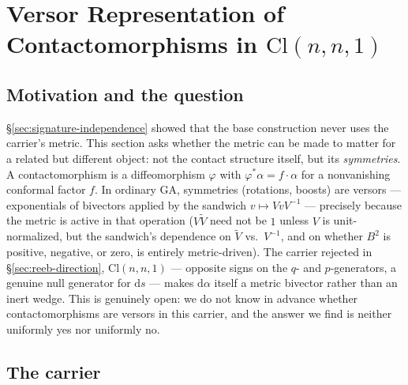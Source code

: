 \documentclass[11pt]{article}
\newcommand{\Cl}{\mathrm{Cl}}
\newcommand{\dif}{\mathrm{d}}
\begin{document}
\section{Versor Representation of Contactomorphisms in \texorpdfstring{$\Cl(n,n,1)$}{Cl(n,n,1)}}
\label{sec:versors}

\subsection{Motivation and the question}

\S\ref{sec:signature-independence} showed that the base construction never uses the carrier's metric. This section asks whether the metric can be made to matter for a related but different object: not the contact structure itself, but its \emph{symmetries}. A contactomorphism is a diffeomorphism $\varphi$ with $\varphi^*\alpha = f\cdot\alpha$ for a nonvanishing conformal factor $f$. In ordinary GA, symmetries (rotations, boosts) are versors — exponentials of bivectors applied by the sandwich $v\mapsto VvV^{-1}$ — precisely because the metric is active in that operation ($V\tilde V$ need not be $1$ unless $V$ is unit-normalized, but the sandwich's dependence on $\tilde V$ vs.\ $V^{-1}$, and on whether $B^2$ is positive, negative, or zero, is entirely metric-driven). The carrier rejected in \S\ref{sec:reeb-direction}, $\Cl(n,n,1)$ — opposite signs on the $q$- and $p$-generators, a genuine null generator for $\dif s$ — makes $\dif\alpha$ itself a metric bivector rather than an inert wedge. This is genuinely open: we do not know in advance whether contactomorphisms are versors in this carrier, and the answer we find is neither uniformly yes nor uniformly no.

\subsection{The carrier}
\end{document}
